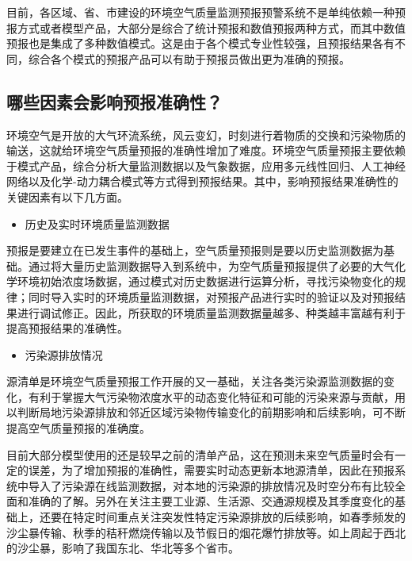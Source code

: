 \documentclass[]{book}
\providecommand{\tightlist}{%
  \setlength{\itemsep}{0pt}\setlength{\parskip}{0pt}}
\begin{document}
目前，各区域、省、市建设的环境空气质量监测预报预警系统不是单纯依赖一种预报方式或者模型产品，大部分是综合了统计预报和数值预报两种方式，而其中数值预报也是集成了多种数值模式。这是由于各个模式专业性较强，且预报结果各有不同，综合各个模式的预报产品可以有助于预报员做出更为准确的预报。

\subsection{哪些因素会影响预报准确性？}

环境空气是开放的大气环流系统，风云变幻，时刻进行着物质的交换和污染物质的输送，这就给环境空气质量预报的准确性增加了难度。环境空气质量预报主要依赖于模式产品，综合分析大量监测数据以及气象数据，应用多元线性回归、人工神经网络以及化学-动力耦合模式等方式得到预报结果。其中，影响预报结果准确性的关键因素有以下几方面。

\begin{itemize}
\tightlist
\item
  历史及实时环境质量监测数据
\end{itemize}

预报是要建立在已发生事件的基础上，空气质量预报则是要以历史监测数据为基础。通过将大量历史监测数据导入到系统中，为空气质量预报提供了必要的大气化学环境初始浓度场数据，通过模式对历史数据进行运算分析，寻找污染物变化的规律；同时导入实时的环境质量监测数据，对预报产品进行实时的验证以及对预报结果进行调试修正。因此，所获取的环境质量监测数据量越多、种类越丰富越有利于提高预报结果的准确性。

\begin{itemize}
\tightlist
\item
  污染源排放情况
\end{itemize}

源清单是环境空气质量预报工作开展的又一基础，关注各类污染源监测数据的变化，有利于掌握大气污染物浓度水平的动态变化特征和可能的污染来源与贡献，用以判断局地污染源排放和邻近区域污染物传输变化的前期影响和后续影响，可不断提高空气质量预报的准确度。

目前大部分模型使用的还是较早之前的清单产品，这在预测未来空气质量时会有一定的误差，为了增加预报的准确性，需要实时动态更新本地源清单，因此在预报系统中导入了污染源在线监测数据，对本地的污染源的排放情况及时空分布有比较全面和准确的了解。另外在关注主要工业源、生活源、交通源规模及其季度变化的基础上，还要在特定时间重点关注突发性特定污染源排放的后续影响，如春季频发的沙尘暴传输、秋季的秸秆燃烧传输以及节假日的烟花爆竹排放等。如上周起于西北的沙尘暴，影响了我国东北、华北等多个省市。
\end{document}
